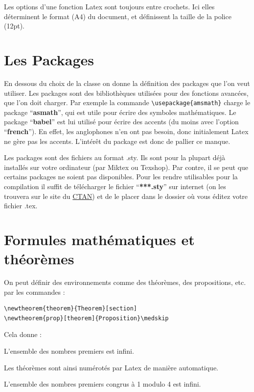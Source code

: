 \documentclass[a4paper,10pt]{book_ad}
\begin{document}
Les options d'une fonction Latex sont toujours entre crochets. Ici elles déterminent le format 
(A4) du document, et définissent la taille de la police (12pt).\medskip
\section{Les Packages}

En dessous du choix de la classe on donne la définition des packages que l'on veut utiliser. 
Les packages sont des bibliothèques utilisées pour des fonctions avancées, que l'on doit charger.
 Par exemple la commande  \lstinline+\usepackage{amsmath}+ charge le package ``\textbf{asmath}'',
 qui est utile  pour écrire des symboles mathématiques. Le package ``\textbf{babel}''  est lui 
utilisé pour écrire des accents (du moins avec l'option ``\textbf{french}''). En effet, les anglophones
 n'en ont pas besoin, donc initialement Latex ne gère pas les accents. L'intérêt du package est
 donc de pallier ce manque. \medskip

Les packages sont des fichiers au format .sty. Ils sont pour la plupart déjà installés sur votre 
ordinateur (par Miktex ou Texshop). Par contre, il se peut que certains packages ne soient pas 
disponibles.  Pour les rendre utilisables pour la compilation il suffit de télécharger le fichier 
``\textbf{***.sty}''  sur internet (on les trouvera sur le site du  \href{http://www.ctan.org/}{CTAN})
  et de le placer dans le dossier où vous éditez votre fichier .tex.     \medskip

\section{Formules mathématiques et théorèmes}
On peut définir des environnements comme des théorèmes, des propositions, etc. par les commandes :\medskip
\begin{lstlisting}
\newtheorem{theorem}{Theorem}[section] 
\newtheorem{prop}[theorem]{Proposition}\medskip
\end{lstlisting}
Cela donne :

\begin{theorem}
 L'ensemble des nombres premiers est infini.
\end{theorem}
Les théorèmes  sont ainsi numérotés par Latex de manière automatique.

\begin{theorem}
 L'ensemble des nombres premiers congrus à 1 modulo 4 est infini.
\end{theorem}
\end{document}
